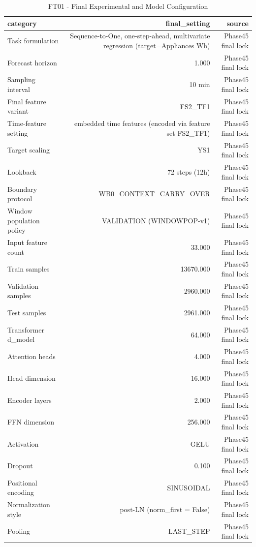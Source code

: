 \begin{table}[h!]
\centering
\caption{FT01 - Final Experimental and Model Configuration}
\label{tab:ft01\_-\_final\_experimental\_and\_model\_configuration}
\begin{tabular}{lrr}
\toprule
category & final\_setting & source \\
\midrule
Task formulation & Sequence-to-One, one-step-ahead, multivariate regression (target=Appliances Wh) & Phase45 final lock \\
Forecast horizon & 1.000 & Phase45 final lock \\
Sampling interval & 10 min & Phase45 final lock \\
Final feature variant & FS2\_TF1 & Phase45 final lock \\
Time-feature setting & embedded time features (encoded via feature set FS2\_TF1) & Phase45 final lock \\
Target scaling & YS1 & Phase45 final lock \\
Lookback & 72 steps (12h) & Phase45 final lock \\
Boundary protocol & WB0\_CONTEXT\_CARRY\_OVER & Phase45 final lock \\
Window population policy & VALIDATION (WINDOWPOP-v1) & Phase45 final lock \\
Input feature count & 33.000 & Phase45 final lock \\
Train samples & 13670.000 & Phase45 final lock \\
Validation samples & 2960.000 & Phase45 final lock \\
Test samples & 2961.000 & Phase45 final lock \\
Transformer d\_model & 64.000 & Phase45 final lock \\
Attention heads & 4.000 & Phase45 final lock \\
Head dimension & 16.000 & Phase45 final lock \\
Encoder layers & 2.000 & Phase45 final lock \\
FFN dimension & 256.000 & Phase45 final lock \\
Activation & GELU & Phase45 final lock \\
Dropout & 0.100 & Phase45 final lock \\
Positional encoding & SINUSOIDAL & Phase45 final lock \\
Normalization style & post-LN (norm\_first = False) & Phase45 final lock \\
Pooling & LAST\_STEP & Phase45 final lock \\

\end{tabular}
\end{table}

